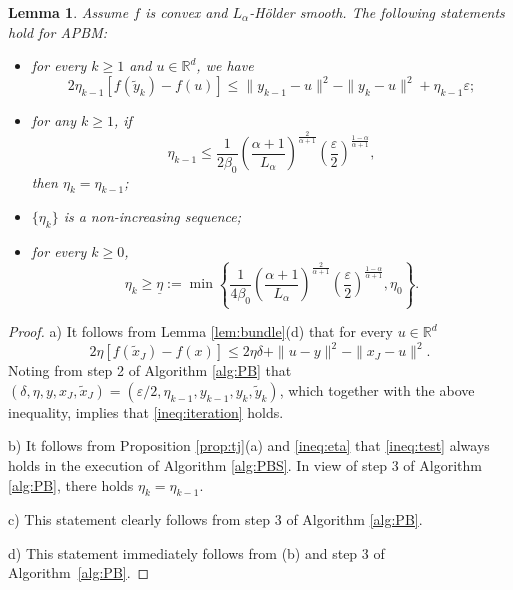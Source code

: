 \documentclass[11pt,letterpaper]{article}
\newtheorem{lemma}[thm]{Lemma}
\newcommand{\R}{\mathbb{R}}
\begin{document}
\begin{lemma}\label{lem:APBM}
Assume $f$ is convex and $L_\alpha$-Hölder smooth. The following statements hold for APBM:
\begin{itemize}
    \item[a)] for every $k\ge 1$ and $u\in \R^d$, we have
    \begin{equation}\label{ineq:iteration}
        2\eta_{k-1}[f(\tilde y_k) - f(u)] \le \|y_{k-1}-u\|^2 - \|y_k - u\|^2 + \eta_{k-1} \varepsilon;
    \end{equation}
    \item[b)] for any $k\ge 1$, if 
    \begin{equation}\label{ineq:eta}
        \eta_{k-1} \le \frac{1}{2\beta_0} \left(\frac{\alpha+1}{L_\alpha} \right)^{\frac{2}{\alpha+1}} \left(\frac{\varepsilon}{2}\right)^{\frac{1-\alpha}{\alpha+1}},
    \end{equation}
then $\eta_k=\eta_{k-1}$;
    \item[c)] $\{\eta_k\}$ is a non-increasing sequence;
    \item[d)] for every $k\ge 0$, 
        \begin{equation}\label{ineq:etak}
        \eta_k \ge \underline{\eta}:= \min \left \lbrace \frac{1}{4\beta_0} \left(\frac{\alpha+1}{L_\alpha} \right)^{\frac{2}{\alpha+1}} \left(\frac{\varepsilon}{2}\right)^{\frac{1-\alpha}{\alpha+1}}, \eta_0 \right\rbrace.
        \end{equation}
\end{itemize}
\end{lemma}
\begin{proof}
    a) It follows from Lemma \ref{lem:bundle}(d) that for every $u \in \R^d$
    \[
    2\eta[f(\tilde x_J) - f(x)] \le 2\eta\delta + \|u-y\|^2 - \|x_J - u\|^2.
    \]
    Noting from step 2 of Algorithm \ref{alg:PB} that $(\delta,\eta,y,x_J,\tilde x_J)=(\varepsilon/2,\eta_{k-1},y_{k-1},y_k,\tilde y_k)$, which together with the above inequality, implies that \eqref{ineq:iteration} holds.
    
    b) It follows from Proposition \ref{prop:tj}(a) and \eqref{ineq:eta} that \eqref{ineq:test} always holds in the execution of Algorithm \ref{alg:PBS}. In view of step 3 of Algorithm \ref{alg:PB}, there holds $\eta_k=\eta_{k-1}$.

    c) This statement clearly follows from step 3 of Algorithm \ref{alg:PB}.

    d) This statement immediately follows from (b) and step 3 of Algorithm~\ref{alg:PB}.
\end{proof}
\end{document}
